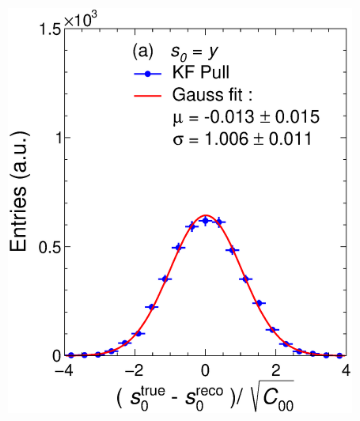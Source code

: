 \begin{figure}[t]
     \centering
     \begin{subfigure}{0.32\textwidth}
         \centering
         \includegraphics[width=\textwidth]{figures/ch4-KF_NDGArLite/Toy/NoCorr/UnitKFEnd_p0.eps}
         \caption{}
         \label{fig:resp0KF_GArLite_NoCorr}
     \end{subfigure}
     \begin{subfigure}{0.32\textwidth}
         \centering

\end{subfigure}
\end{figure}
